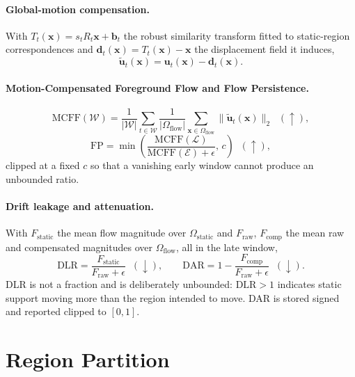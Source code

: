 \documentclass[10pt,twocolumn,letterpaper]{article}
\begin{document}
\paragraph{Global-motion compensation.}
With $T_t(\mathbf{x}) = s_t R_t \mathbf{x} + \mathbf{b}_t$ the robust similarity
transform fitted to static-region correspondences and
$\mathbf{d}_t(\mathbf{x}) = T_t(\mathbf{x})-\mathbf{x}$ the displacement field it
induces,
\begin{equation}
\tilde{\mathbf{u}}_t(\mathbf{x}) = \mathbf{u}_t(\mathbf{x}) - \mathbf{d}_t(\mathbf{x}).
\end{equation}

\paragraph{Motion-Compensated Foreground Flow and Flow Persistence.}
\begin{equation}
\mathrm{MCFF}(\mathcal{W}) = \frac{1}{|\mathcal{W}|}\sum_{t\in\mathcal{W}}
\frac{1}{|\Omega_{\mathrm{flow}}|}\sum_{\mathbf{x}\in\Omega_{\mathrm{flow}}}
\lVert \tilde{\mathbf{u}}_t(\mathbf{x}) \rVert_2
\;\;(\uparrow),
\end{equation}
\begin{equation}
\mathrm{FP} = \min\!\left(\frac{\mathrm{MCFF}(\mathcal{L})}{\mathrm{MCFF}(\mathcal{E})+\epsilon},\, c\right)
\;\;(\uparrow),
\end{equation}
clipped at a fixed $c$ so that a vanishing early window cannot produce an
unbounded ratio.

\paragraph{Drift leakage and attenuation.}
With $F_{\mathrm{static}}$ the mean flow magnitude over $\Omega_{\mathrm{static}}$
and $F_{\mathrm{raw}}$, $F_{\mathrm{comp}}$ the mean raw and compensated
magnitudes over $\Omega_{\mathrm{flow}}$, all in the late window,
\begin{equation}
\mathrm{DLR} = \frac{F_{\mathrm{static}}}{F_{\mathrm{raw}}+\epsilon}\;\;(\downarrow),
\qquad
\mathrm{DAR} = 1 - \frac{F_{\mathrm{comp}}}{F_{\mathrm{raw}}+\epsilon}\;\;(\downarrow).
\end{equation}
DLR is not a fraction and is deliberately unbounded: $\mathrm{DLR}>1$ indicates
static support moving more than the region intended to move. DAR is stored
signed and reported clipped to $[0,1]$.

\section{Region Partition}
\label{sup:masks}
\end{document}
